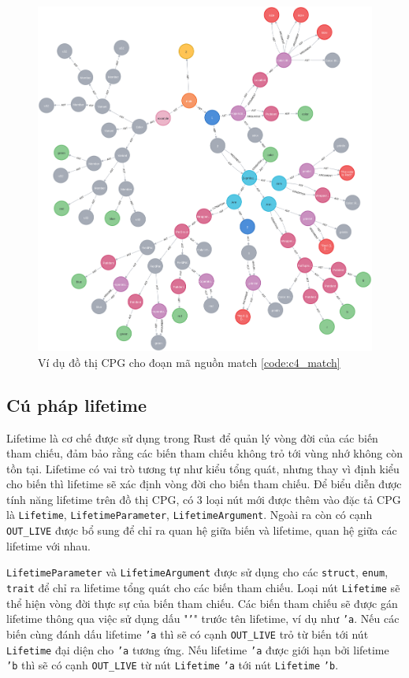 \begin{figure}[H]
    \includegraphics[width=1\columnwidth]{figures/c4/c4_match.png}
    \centering
    \caption{Ví dụ đồ thị CPG cho đoạn mã nguồn match \ref{code:c4_match}}
    \label{img:c4_match}
\end{figure}

\subsection{Cú pháp lifetime}

Lifetime là cơ chế được sử dụng trong Rust để quản lý vòng đời của các biến tham chiếu, đảm bảo rằng các biến tham chiếu không trỏ tới vùng nhớ không còn tồn tại.
Lifetime có vai trò tương tự như kiểu tổng quát, nhưng thay vì định kiểu cho biến thì lifetime sẽ xác định vòng đời cho biến tham chiếu.
Để biểu diễn được tính năng lifetime trên đồ thị CPG, có 3 loại nút mới được thêm vào đặc tả CPG là \texttt{Lifetime}, \texttt{LifetimeParameter}, \texttt{LifetimeArgument}.
Ngoài ra còn có cạnh \texttt{OUT\_LIVE} được bổ sung để chỉ ra quan hệ giữa biến và lifetime, quan hệ giữa các lifetime với nhau.

\texttt{LifetimeParameter} và \texttt{LifetimeArgument} được sử dụng cho các \texttt{struct}, \texttt{enum}, \texttt{trait} để chỉ ra lifetime tổng quát cho các biến tham chiếu.
Loại nút \texttt{Lifetime} sẽ thể hiện vòng đời thực sự của biến tham chiếu.
Các biến tham chiếu sẽ được gán lifetime thông qua việc sử dụng dấu "\texttt{'}" trước tên lifetime, ví dụ như \texttt{'a}.
Nếu các biến cùng đánh dấu lifetime \texttt{'a} thì sẽ có cạnh \texttt{OUT\_LIVE} trỏ từ biến tới nút \texttt{Lifetime} đại diện cho \texttt{'a} tương ứng.
Nếu lifetime \texttt{'a} được giới hạn bởi lifetime \texttt{'b} thì sẽ có cạnh \texttt{OUT\_LIVE} từ nút \texttt{Lifetime} \texttt{'a} tới nút \texttt{Lifetime} \texttt{'b}.


